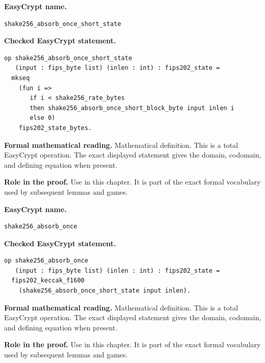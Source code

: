 \begin{formaldefinition}
\noindent\textbf{EasyCrypt name.}
\begin{lstlisting}[language=EasyCrypt,basicstyle=\ttfamily\scriptsize]
shake256_absorb_once_short_state
\end{lstlisting}
\noindent\textbf{Checked EasyCrypt statement.}
\begin{lstlisting}[language=EasyCrypt,basicstyle=\ttfamily\scriptsize]
op shake256_absorb_once_short_state
   (input : fips_byte list) (inlen : int) : fips202_state =
  mkseq
    (fun i =>
       if i < shake256_rate_bytes
       then shake256_absorb_once_short_block_byte input inlen i
       else 0)
    fips202_state_bytes.
\end{lstlisting}
\noindent\textbf{Formal mathematical reading.}
Mathematical definition. This is a total EasyCrypt operation.  The exact displayed statement gives the domain, codomain, and defining equation when present.

\noindent\textbf{Role in the proof.}
Use in this chapter. It is part of the exact formal vocabulary used by subsequent lemmas and games.

\end{formaldefinition}

\begin{formaldefinition}
\noindent\textbf{EasyCrypt name.}
\begin{lstlisting}[language=EasyCrypt,basicstyle=\ttfamily\scriptsize]
shake256_absorb_once
\end{lstlisting}
\noindent\textbf{Checked EasyCrypt statement.}
\begin{lstlisting}[language=EasyCrypt,basicstyle=\ttfamily\scriptsize]
op shake256_absorb_once
   (input : fips_byte list) (inlen : int) : fips202_state =
  fips202_keccak_f1600
    (shake256_absorb_once_short_state input inlen).
\end{lstlisting}
\noindent\textbf{Formal mathematical reading.}
Mathematical definition. This is a total EasyCrypt operation.  The exact displayed statement gives the domain, codomain, and defining equation when present.

\noindent\textbf{Role in the proof.}
Use in this chapter. It is part of the exact formal vocabulary used by subsequent lemmas and games.

\end{formaldefinition}

